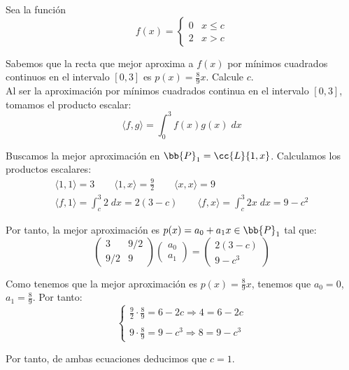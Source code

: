 \begin{ejercicio}
    Sea la función
    \begin{equation*}
        f(x)=\left\{\begin{array}{cc}
            0 & x\leq c \\
            2 & x>c
        \end{array}\right.
    \end{equation*}

    Sabemos que la recta que mejor aproxima a $f(x)$ por mínimos cuadrados continuos en el intervalo $[0, 3]$ es $\displaystyle p(x) = \frac{8}{9}x$. Calcule $c$.\\

    Al ser la aproximación por mínimos cuadrados continua en el intervalo $[0,3]$, tomamos el producto escalar:
    \begin{equation*}
        \langle f,g\rangle = \int_0^3 f(x)g(x)\;dx
    \end{equation*}

    Buscamos la mejor aproximación en $\bb{P}_1=\cc{L}\{1,x\}$. Calculamos los productos escalares:
    \begin{gather*}
        \langle 1,1\rangle = 3
        \qquad
        \langle 1,x\rangle = \frac{9}{2}
        \qquad
        \langle x,x\rangle = 9
        \\
        \langle f,1\rangle = \int_c^3 2\;dx = 2(3-c)
        \qquad
        \langle f,x\rangle = \int_c^3 2x\;dx = 9-c^2 
    \end{gather*}

    Por tanto, la mejor aproximación es $p(x)=a_0+a_1x \in \bb{P}_1$ tal que:
    \begin{equation*}
        \left(\begin{array}{cc}
            3 & 9/2 \\
            9/2 & 9
        \end{array}\right)
        \left(\begin{array}{c}
            a_0 \\ a_1    
        \end{array}\right)
        = 
        \left(\begin{array}{c}
            2(3-c) \\ 9-c^3
        \end{array}\right)
    \end{equation*}

    Como tenemos que la mejor aproximación es $p(x)=\frac{8}{9}x$, tenemos que $a_0=0$, $a_1=\frac{8}{9}$. Por tanto:
    \begin{equation*}
        \left\{\begin{array}{c}
            \displaystyle \frac{9}{2}\cdot \frac{8}{9} = 6-2c \Longrightarrow 4 = 6-2c  \\
            \\
            \displaystyle 9\cdot \frac{8}{9} = 9-c^3 \Longrightarrow 8=9-c^3
        \end{array}\right.
    \end{equation*}

    Por tanto, de ambas ecuaciones deducimos que $c=1$.
\end{ejercicio}



